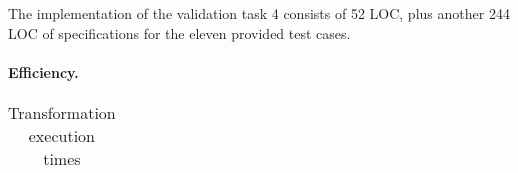 \documentclass[11pt]{article}
\begin{document}
The implementation of the validation task 4 consists of 52 LOC, plus another
244 LOC of specifications for the eleven provided test cases.

\paragraph{Efficiency.}

\begin{table}[h!]
  \centering
  \begin{tabular}{| l | r | r | r | r |}
    
  \end{tabular}
  \caption{Transformation execution times}
  \label{tab:eval-perf}
\end{table}



\end{document}
